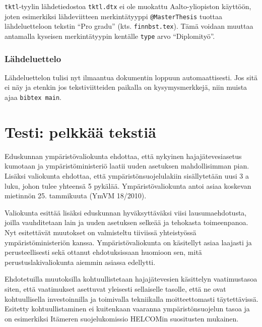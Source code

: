 \verb!tktl!-tyylin lähdetiedostoa \verb!tktl.dtx! ei ole
muokattu Aalto-yliopiston käyttöön, joten esimerkiksi 
lähdeviitteen merkintätyyppi \verb!@MasterThesis! tuottaa lähdeluetteloon
tekstin ``Pro gradu'' (kts. \verb!finnbst.tex!).
Tämä voidaan muuttaa antamalla kyseisen merkintätyypin kentälle
\verb!type! arvo ``Diplomityö''. 

\subsubsection{Lähdeluettelo}
\label{sec:esimlahdeluettelo}

Lähdeluettelon tulisi nyt ilmaantua dokumentin loppuun
automaattisesti. Jos sitä ei näy ja etenkin jos tekstiviitteiden
paikalla on kysymysmerkkejä, niin muista ajaa \verb!bibtex main!.


%

\section{Testi: pelkkää tekstiä}

Eduskunnan ympäristövaliokunta ehdottaa, että nykyinen
hajajätevesiasetus kumotaan ja ympäristöministeriö laatii uuden
asetuksen mahdollisimman pian. Lisäksi valiokunta ehdottaa, että
ympäristönsuojelulakiin sisällytetään uusi 3 a luku, johon tulee
yhteensä 5 pykälää. Ympäristövaliokunta antoi asiaa koskevan mietinnön
25. tammikuuta (YmVM 18/2010).

Valiokunta esittää lisäksi eduskunnan hyväksyttäväksi viisi
lausumaehdotusta, joilla vauhditetaan lain ja uuden asetuksen selkeää
ja tehokasta toimeenpanoa. Nyt esitettävät muutokset on valmisteltu
tiiviissä yhteistyössä ympäristöministeriön
kanssa. Ympäristövaliokunta on käsitellyt asiaa laajasti ja
perusteellisesti sekä ottanut ehdotuksissaan huomioon sen, mitä
perustuslakivaliokunta aiemmin asiassa edellytti.

Ehdotetuilla muutoksilla kohtuullistetaan hajajätevesien käsittelyn
vaatimustasoa siten, että vaatimukset asettuvat yleisesti sellaiselle
tasolle, että ne ovat kohtuullisella investoinnilla ja toimivalla
tekniikalla moitteettomasti täytettävissä. Esitetty kohtuullistaminen
ei kuitenkaan vaaranna ympäristönsuojelun tasoa ja on esimerkiksi
Itämeren suojelukomissio HELCOMin suositusten mukainen.

